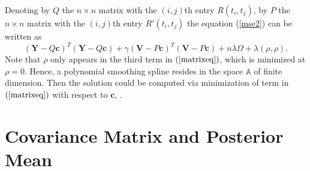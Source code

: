 Denoting by $Q$ the $n \times n$ matrix with the $(i,j)$th entry $R(t_i,t_j)$, by $P$ the $n \times n$ matrix with the $(i,j)$th entry $\dot{R}'(t_i,t_j)$ the equation (\ref{mse2}) can be written as
\begin{equation}\label{matrixeq}
(\mathbf{Y}-Q\mathbf{c})^T(\mathbf{Y}-Q\mathbf{c})+\gamma (\mathbf{V}-P\mathbf{c})^T(\mathbf{V}- P\mathbf{c})+n\lambda \Omega+\lambda(\rho,\rho).
\end{equation}
Note that $\rho$ only appears in the third term in $(\ref{matrixeq})$, which is minimized at $\rho=0$. Hence, a polynomial smoothing spline resides in the space $\mathbb{A} $ of finite dimension. Then the solution could be computed via minimization of term in $(\ref{matrixeq})$ with respect to $\mathbf{c}$, \cite{gubook}.

\section{Covariance Matrix and Posterior Mean}

